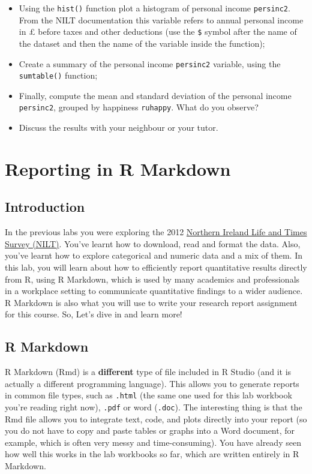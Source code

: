 \documentclass[
]{book}
\providecommand{\tightlist}{%
  \setlength{\itemsep}{0pt}\setlength{\parskip}{0pt}}
\begin{document}
\begin{itemize}
\tightlist
\item
  Using the \texttt{hist()} function plot a histogram of personal income \texttt{persinc2}. From the NILT documentation this variable refers to annual personal income in £ before taxes and other deductions (use the \texttt{\$} symbol after the name of the dataset and then the name of the variable inside the function);
\item
  Create a summary of the personal income \texttt{persinc2} variable, using the \texttt{sumtable()} function;
\item
  Finally, compute the mean and standard deviation of the personal income \texttt{persinc2}, grouped by happiness \texttt{ruhappy}. What do you observe?
\item
  Discuss the results with your neighbour or your tutor.
\end{itemize}

\hypertarget{reporting-in-r-markdown}{%
\chapter{Reporting in R Markdown}\label{reporting-in-r-markdown}}

\hypertarget{introduction}{%
\section{Introduction}\label{introduction}}

In the previous labs you were exploring the 2012 \href{https://www.ark.ac.uk/nilt/}{Northern Ireland Life and Times Survey (NILT)}. You've learnt how to download, read and format the data. Also, you've learnt how to explore categorical and numeric data and a mix of them. In this lab, you will learn about how to efficiently report quantitative results directly from R, using R Markdown, which is used by many academics and professionals in a workplace setting to communicate quantitative findings to a wider audience. R Markdown is also what you will use to write your research report assignment for this course. So, Let's dive in and learn more!

\hypertarget{r-markdown}{%
\section{R Markdown}\label{r-markdown}}

R Markdown (Rmd) is a \textbf{different} type of file included in R Studio (and it is actually a different programming language). This allows you to generate reports in common file types, such as \texttt{.html} (the same one used for this lab workbook you're reading right now), \texttt{.pdf} or word (\texttt{.doc}). The interesting thing is that the Rmd file allows you to integrate text, code, and plots directly into your report (so you do not have to copy and paste tables or graphs into a Word document, for example, which is often very messy and time-consuming). You have already seen how well this works in the lab workbooks so far, which are written entirely in R Markdown.
\end{document}
